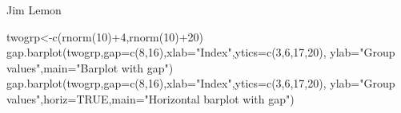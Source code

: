 \begin{Author}\relax
Jim Lemon
\end{Author}
\begin{SeeAlso}\relax
{}
\end{SeeAlso}
\begin{Examples}
\begin{ExampleCode}
 twogrp<-c(rnorm(10)+4,rnorm(10)+20)
 gap.barplot(twogrp,gap=c(8,16),xlab="Index",ytics=c(3,6,17,20),
  ylab="Group values",main="Barplot with gap")
 gap.barplot(twogrp,gap=c(8,16),xlab="Index",ytics=c(3,6,17,20),
  ylab="Group values",horiz=TRUE,main="Horizontal barplot with gap")
\end{ExampleCode}
\end{Examples}

